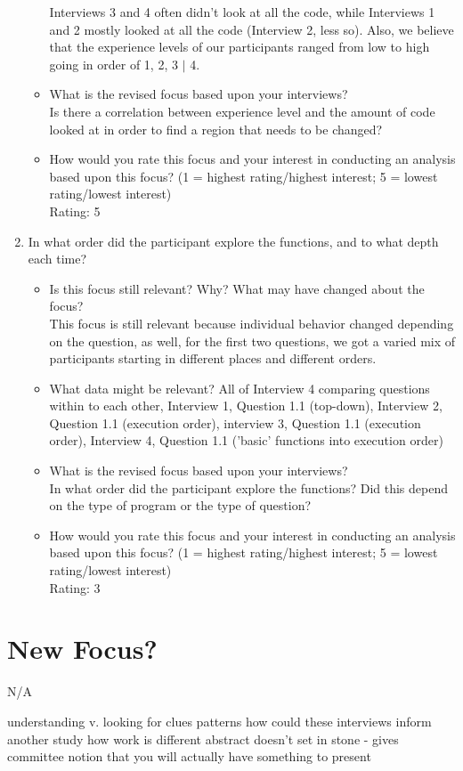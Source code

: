 \documentclass{article}
\begin{document}
\begin{enumerate}
\begin{itemize}
Interviews 3 and 4 often didn't look at all the code, while Interviews 1 and 2 mostly looked at all the code (Interview 2, less so). Also, we believe that the experience levels of our participants ranged from low to high going in order of 1, 2, 3 $|$ 4.
\item What is the revised focus based upon your interviews? \\
Is there a correlation between experience level and the amount of code looked at in order to find a region that needs to be changed?
\item How would you rate this focus and your interest in conducting an analysis based upon this focus? (1 = highest rating/highest interest; 5 = lowest rating/lowest interest) \\
Rating: 5
  \end{itemize}
\item In what order did the participant explore the functions, and to what depth each time?
  \begin{itemize}
\item Is this focus still relevant? Why? What may have changed about the focus? \\
 This focus is still relevant because individual behavior changed depending on the question, as well, for the first two questions, we got a varied mix of participants starting in different places and different orders. 
\item What data might be relevant? All of Interview 4 comparing questions within to each other, Interview 1, Question 1.1 (top-down), Interview 2, Question 1.1 (execution order), interview 3, Question 1.1 (execution order), Interview 4, Question 1.1 ('basic' functions into execution order)
\item What is the revised focus based upon your interviews? \\
In what order did the participant explore the functions? Did this depend on the type of program or the type of question?
\item How would you rate this focus and your interest in conducting an analysis based upon this focus? (1 = highest rating/highest interest; 5 = lowest rating/lowest interest) \\
Rating: 3
  \end{itemize}
\end{enumerate}
\section{New Focus?}
N/A

understanding v. looking for clues
patterns 
how could these interviews inform another study
how work is different
abstract doesn't set in stone - gives committee notion that you will actually have something to present
\end{document}
